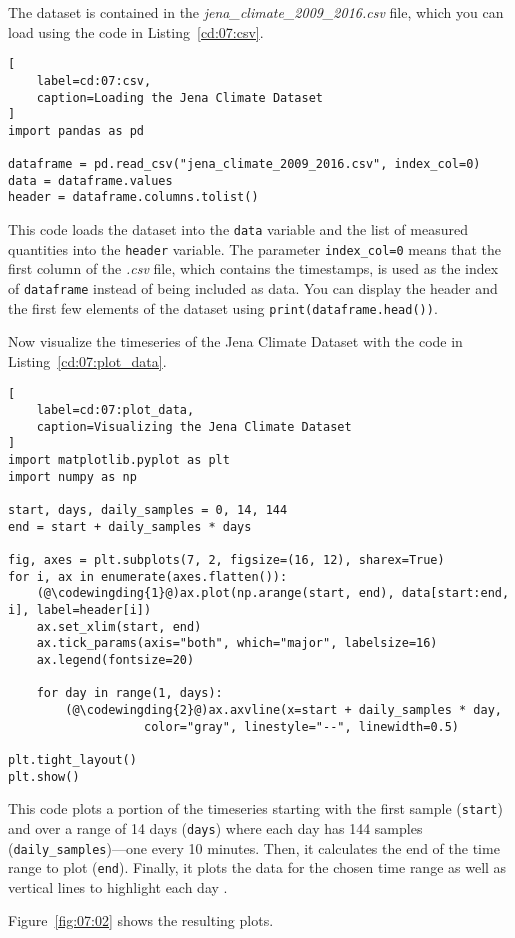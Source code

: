 The dataset is contained in the \emph{jena\_climate\_2009\_2016.csv} file, which you can load using the code in Listing~\ref{cd:07:csv}.
\begin{lstlisting}[
    label=cd:07:csv,
    caption=Loading the Jena Climate Dataset
]
import pandas as pd

dataframe = pd.read_csv("jena_climate_2009_2016.csv", index_col=0)
data = dataframe.values
header = dataframe.columns.tolist()
\end{lstlisting}
This code loads the dataset into the \lstinline{data} variable and the list of measured quantities into the \lstinline{header} variable. 
The parameter \lstinline{index_col=0} means that the first column of the \emph{.csv} file, which contains the timestamps, is used as the index of \lstinline{dataframe} instead of being included as data.
You can display the header and the first few elements of the dataset using \lstinline{print(dataframe.head())}.

Now visualize the timeseries of the Jena Climate Dataset with the code in Listing~\ref{cd:07:plot_data}.
\begin{lstlisting}[
    label=cd:07:plot_data,
    caption=Visualizing the Jena Climate Dataset
]
import matplotlib.pyplot as plt
import numpy as np

start, days, daily_samples = 0, 14, 144
end = start + daily_samples * days

fig, axes = plt.subplots(7, 2, figsize=(16, 12), sharex=True)
for i, ax in enumerate(axes.flatten()):
    (@\codewingding{1}@)ax.plot(np.arange(start, end), data[start:end, i], label=header[i])
    ax.set_xlim(start, end)
    ax.tick_params(axis="both", which="major", labelsize=16)
    ax.legend(fontsize=20)
    
    for day in range(1, days):
        (@\codewingding{2}@)ax.axvline(x=start + daily_samples * day,
                   color="gray", linestyle="--", linewidth=0.5)

plt.tight_layout()
plt.show()
\end{lstlisting}
This code plots a portion of the timeseries starting with the first sample (\lstinline{start}) and over a range of 14 days (\lstinline{days}) where each day has 144 samples (\lstinline{daily_samples})---one every 10 minutes.
Then, it calculates the end of the time range to plot (\lstinline{end}).
Finally, it plots the data for the chosen time range  as well as vertical lines to highlight each day .

Figure~\ref{fig:07:02} shows the resulting plots.

